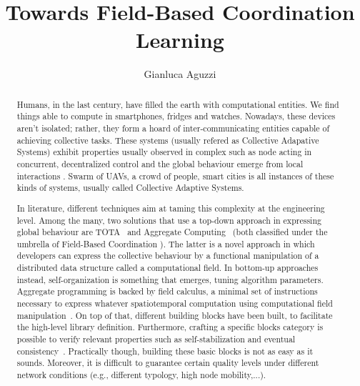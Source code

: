 \documentclass[3p]{elsarticle}
\begin{document}
\begin{frontmatter}

\title{Towards Field-Based Coordination Learning} %


\author{Gianluca Aguzzi}
\address{\texttt{gianluca.aguzzi@unibo.it}}
\begin{abstract}
Humans, in the last century, have filled the earth with computational entities. 
%
We find things able to compute in smartphones, fridges and watches. %
Nowadays, these devices aren't isolated; rather, they form a hoard of inter-communicating entities capable of achieving collective tasks. 
These systems (usually refered as Collective Adapative Systems) exhibit properties usually observed in complex such as node acting in concurrent, 
decentralized control and the global behaviour emerge from local interactions \cite{DBLP:conf/huc/Ferscha15}. 
Swarm of UAVs, a crowd of people, smart cities is all instances of these kinds of systems, usually called Collective Adaptive Systems.

In literature, different techniques aim at taming this complexity at the engineering level.
%
Among the many, two solutions that use a top-down approach in expressing global behaviour are TOTA~\cite{DBLP:journals/tosem/MameiZ09} and Aggregate Computing~\cite{DBLP:journals/computer/BealPV15} (both classified under the umbrella of Field-Based Coordination \cite{DBLP:books/daglib/0015276}).
%
The latter is a novel approach in which developers can express the collective behaviour by 
a functional manipulation of a distributed data structure called a computational field.
%
In bottom-up approaches instead, self-organization is something that emerges, tuning algorithm parameters.
%
Aggregate programming is backed by field calculus, a minimal set of instructions necessary to express whatever spatiotemporal computation using computational field manipulation~\cite{DBLP:conf/coordination/AudritoBDV18}. 
%
On top of that, different building blocks have been built, to facilitate the high-level library definition.
%
Furthermore, crafting a specific blocks category is possible to verify relevant properties such as self-stabilization \cite{DBLP:conf/coordination/ViroliD14} and eventual consistency~\cite{DBLP:conf/saso/BealVPD16}.
%
Practically though, building these basic blocks is not as easy as it sounds. Moreover, it is difficult to guarantee certain quality levels under different network conditions (e.g., different typology, high node mobility,...).


\end{abstract}
\end{frontmatter}
\end{document}
